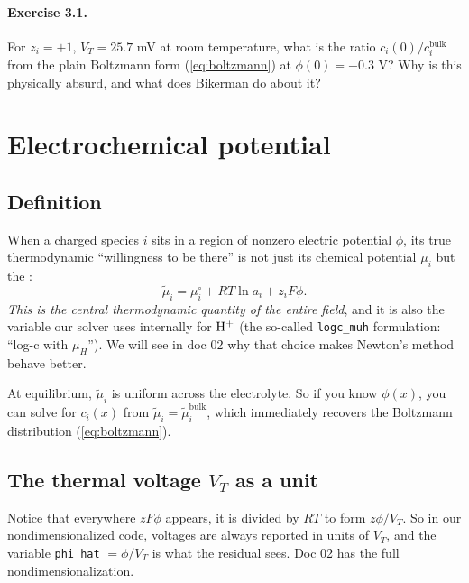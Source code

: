 \documentclass[11pt]{article}
\begin{document}
\paragraph{Exercise 3.1.} For $z_i = +1$, $V_T = 25.7$ mV at room
temperature, what is the ratio $c_i(0)/c_i^{\mathrm{bulk}}$ from the
plain Boltzmann form (\ref{eq:boltzmann}) at $\phi(0) = -0.3$ V? Why
is this physically absurd, and what does Bikerman do about it?

\section{Electrochemical potential}

\subsection{Definition}

When a charged species $i$ sits in a region of nonzero electric
potential $\phi$, its true thermodynamic ``willingness to be there''
is not just its chemical potential $\mu_i$ but the
:
\begin{equation}
  \tilde\mu_i = \mu_i^{\circ} + RT \ln a_i + z_i F \phi.
  \label{eq:echempot}
\end{equation}
\textit{This is the central thermodynamic quantity of the entire
field}, and it is also the variable our solver uses internally for
$\mathrm{H^+}$ (the so-called \texttt{logc\_muh} formulation: ``log-c with
$\mu_H$''). We will see in doc 02 why that choice makes Newton's
method behave better.

At equilibrium, $\tilde\mu_i$ is uniform across the electrolyte. So
if you know $\phi(x)$, you can solve for $c_i(x)$ from
$\tilde\mu_i = \tilde\mu_i^{\mathrm{bulk}}$, which immediately
recovers the Boltzmann distribution (\ref{eq:boltzmann}).

\subsection{The thermal voltage $V_T$ as a unit}

Notice that everywhere $z F \phi$ appears, it is divided by $RT$ to
form $z\phi/V_T$. So in our nondimensionalized code, voltages are
always reported in units of $V_T$, and the variable
\texttt{phi\_hat} $= \phi/V_T$ is what the residual sees. Doc 02 has
the full nondimensionalization.
\end{document}

